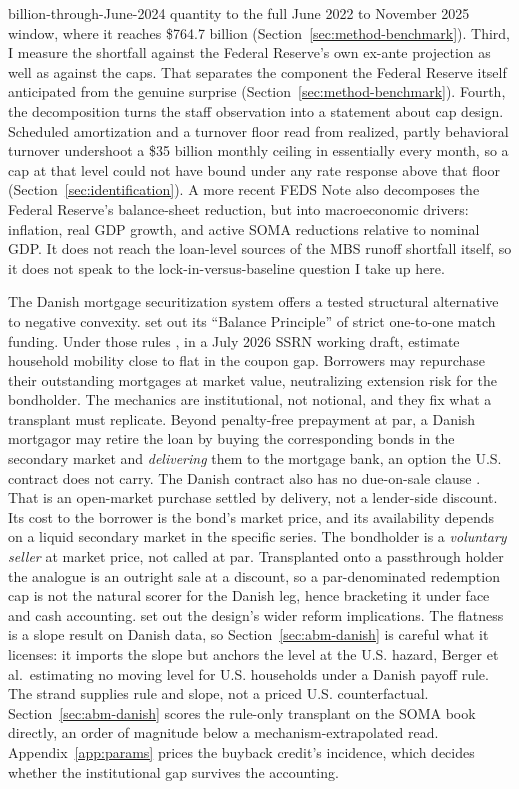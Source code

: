 \documentclass[12pt]{article}
\begin{document}
billion-through-June-2024 quantity to the full June 2022 to November 2025 window, where it reaches \$764.7 billion (Section~\ref{sec:method-benchmark}). Third, I measure the shortfall against the Federal Reserve's own ex-ante projection as well as against the caps. That separates the component the Federal Reserve itself anticipated from the genuine surprise (Section~\ref{sec:method-benchmark}). Fourth, the decomposition turns the staff observation into a statement about cap design. Scheduled amortization and a turnover floor read from realized, partly behavioral turnover undershoot a \$35 billion monthly ceiling in essentially every month, so a cap at that level could not have bound under any rate response above that floor (Section~\ref{sec:identification}). A more recent \citet{eyal2026} FEDS Note also decomposes the Federal Reserve's balance-sheet reduction, but into macroeconomic drivers: inflation, real GDP growth, and active SOMA reductions relative to nominal GDP. It does not reach the loan-level sources of the MBS runoff shortfall itself, so it does not speak to the lock-in-versus-baseline question I take up here.

The Danish mortgage securitization system offers a tested structural alternative to negative convexity. \citet{berg2018} set out its ``Balance Principle'' of strict one-to-one match funding. Under those rules \citet[\S3.3.2]{berger2026}, in a July 2026 SSRN working draft, estimate household mobility close to flat in the coupon gap. Borrowers may repurchase their outstanding mortgages at market value, neutralizing extension risk for the bondholder. The mechanics are institutional, not notional, and they fix what a transplant must replicate. Beyond penalty-free prepayment at par, a Danish mortgagor may retire the loan by buying the corresponding bonds in the secondary market and \emph{delivering} them to the mortgage bank, an option the U.S. contract does not carry. The Danish contract also has no due-on-sale clause \citep{frankel2004}. That is an open-market purchase settled by delivery, not a lender-side discount. Its cost to the borrower is the bond's market price, and its availability depends on a liquid secondary market in the specific series. The bondholder is a \emph{voluntary seller} at market price, not called at par. Transplanted onto a passthrough holder the analogue is an outright sale at a discount, so a par-denominated redemption cap is not the natural scorer for the Danish leg, hence bracketing it under face and cash accounting. \citet{svenstrup2006} set out the design's wider reform implications. The flatness is a slope result on Danish data, so Section~\ref{sec:abm-danish} is careful what it licenses: it imports the slope but anchors the level at the U.S. hazard, Berger et al.\ estimating no moving level for U.S. households under a Danish payoff rule. The strand supplies rule and slope, not a priced U.S. counterfactual. Section~\ref{sec:abm-danish} scores the rule-only transplant on the SOMA book directly, an order of magnitude below a mechanism-extrapolated read. Appendix~\ref{app:params} prices the buyback credit's incidence, which decides whether the institutional gap survives the accounting.
\end{document}
